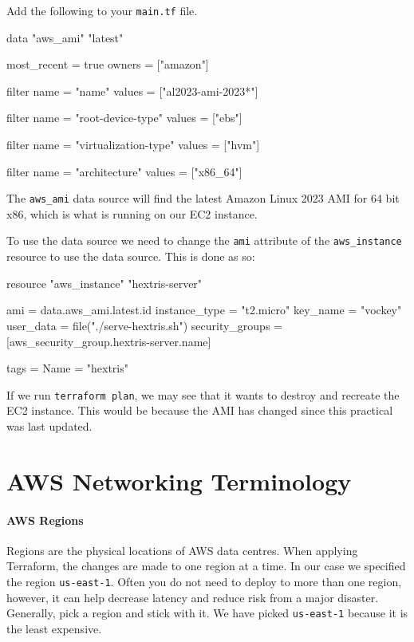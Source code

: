 \documentclass{csse4400}
\begin{document}
Add the following to your \texttt{main.tf} file.

\begin{code}[language=terraform,numbers=none]{}
data "aws_ami" "latest" {
  most_recent = true
  owners      = ["amazon"]

  filter {
    name   = "name"
    values = ["al2023-ami-2023*"]
  }

  filter {
    name   = "root-device-type"
    values = ["ebs"]
  }

  filter {
    name   = "virtualization-type"
    values = ["hvm"]
  }

  filter {
    name   = "architecture"
    values = ["x86_64"]
  }
}
\end{code}

The \texttt{aws\_ami} data source will find the latest Amazon Linux 2023 AMI for 64 bit x86, which is what is running on our EC2 instance.

To use the data source we need to change the \texttt{ami} attribute of the \texttt{aws\_instance} resource to use the data source. This is done as so:

\begin{code}[language=terraform,numbers=none]{}
resource "aws_instance" "hextris-server" {
  ami             = data.aws_ami.latest.id
  instance_type   = "t2.micro"
  key_name        = "vockey"
  user_data       = file("./serve-hextris.sh")
  security_groups = [aws_security_group.hextris-server.name]

  tags = {
    Name = "hextris"
  }
}
\end{code}

If we run \texttt{terraform plan}, we may see that it wants to destroy and recreate the EC2 instance.
This would be because the AMI has changed since this practical was last updated.






\appendix

\section{AWS Networking Terminology}
\paragraph{AWS Regions}
Regions are the physical locations of AWS data centres.
When applying Terraform, the changes are made to one region at a time.
In our case we specified the region \texttt{us-east-1}.
Often you do not need to deploy to more than one region, however,
it can help decrease latency and reduce risk from a major disaster.
Generally, pick a region and stick with it.
We have picked \texttt{us-east-1} because it is the least expensive.
\end{document}
